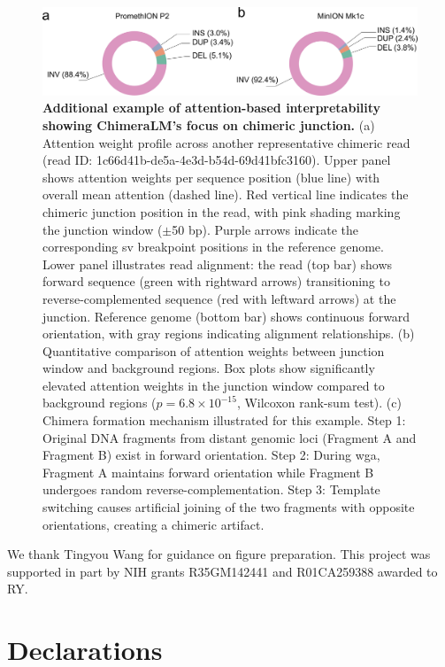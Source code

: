 \documentclass[pdflatex,sn-nature]{sn-jnl}%
\theoremstyle{thmstyleone}%
\theoremstyle{thmstyletwo}%
\theoremstyle{thmstylethree}%
\begin{document}
\begin{figure}[!ht]
	\begin{center}
		\includegraphics[width=\textwidth]{final_figures/sf3}
	\end{center}
	\caption{{\bf Additional example of attention-based interpretability showing ChimeraLM's focus on chimeric junction.}
		(a) Attention weight profile across another representative chimeric read (read ID: 1c66d41b-de5a-4e3d-b54d-69d41bfc3160). Upper panel shows attention weights per sequence position (blue line) with overall mean attention (dashed line). Red vertical line indicates the chimeric junction position in the read, with pink shading marking the junction window ($\pm$50 bp). Purple arrows indicate the corresponding \gls{sv} breakpoint positions in the reference genome. Lower panel illustrates read alignment: the read (top bar) shows forward sequence (green with rightward arrows) transitioning to reverse-complemented sequence (red with leftward arrows) at the junction. Reference genome (bottom bar) shows continuous forward orientation, with gray regions indicating alignment relationships.
		(b) Quantitative comparison of attention weights between junction window and background regions. Box plots show significantly elevated attention weights in the junction window compared to background regions ($p = 6.8 \times 10^{-15}$, Wilcoxon rank-sum test).
		(c) Chimera formation mechanism illustrated for this example. Step 1: Original DNA fragments from distant genomic loci (Fragment A and Fragment B) exist in forward orientation. Step 2: During \gls{wga}, Fragment A maintains forward orientation while Fragment B undergoes random reverse-complementation. Step 3: Template switching causes artificial joining of the two fragments with opposite orientations, creating a chimeric artifact.}\label{fig:sf3}
\end{figure}


We thank Tingyou Wang for guidance on figure preparation.
This project was supported in part by NIH grants R35GM142441 and R01CA259388 awarded to RY.

\section*{Declarations}
\end{document}
